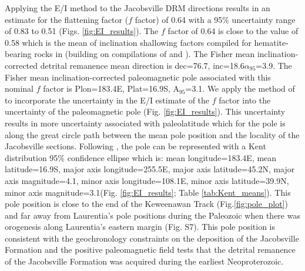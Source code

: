 Applying the E/I method to the Jacobsville DRM directions results in an estimate for the flattening factor ($f$ factor) of 0.64 with a 95\% uncertainty range of 0.83 to 0.51 (Figs. \ref{fig:EI_results}). The $f$ factor of 0.64 is close to the value of 0.58 which is the mean of inclination shallowing factors compiled for hematite-bearing rocks in \cite{Pierce2022a} (building on compilations of \cite{Bilardello2016b} and \cite{Vaes2021a}). The Fisher mean inclination-corrected detrital remanence mean direction is dec=76.7\textdegree, inc=18.6\textdegree $\alpha_{95}$=3.9\textdegree. The Fisher mean inclination-corrected paleomagnetic pole associated with this nominal $f$ factor is Plon=183.4\textdegree E, Plat=16.9\textdegree S, A$_{95}$=3.1\textdegree. We apply the method of \cite{Pierce2022a} to incorporate the uncertainty in the E/I estimate of the $f$ factor into the uncertainty of the paleomagnetic pole (Fig. \ref{fig:EI_results}). This uncertainty results in more uncertainty associated with paleolatitude which for the pole is along the great circle path between the mean pole position and the locality of the Jacobsville sections. Following \cite{Pierce2022a}, the pole can be represented with a Kent distribution 95\% confidence ellipse which is: mean longitude=183.4\textdegree E, mean latitude=16.9\textdegree S, major axis longitude=255.5\textdegree E, major axis latitude=45.2\textdegree N, major axis magnitude=4.1\textdegree, minor axis longitude=108.1\textdegree E, minor axis latitude=39.9\textdegree N, minor axis magnitude=3.1\textdegree (Fig. \ref{fig:EI_results}; Table \ref{tab:Kent_means}). This pole position is close to the end of the Keweenawan Track (Fig.\ref{fig:pole_plot}) and far away from Laurentia's pole positions during the Paleozoic when there was orogenesis along Laurentia's eastern margin (Fig. S7). This pole position is consistent with the geochronology constraints on the deposition of the Jacobsville Formation and the positive paleomagnetic field tests that the detrital remanence of the Jacobsville Formation was acquired during the earliest Neoproterozoic. 


